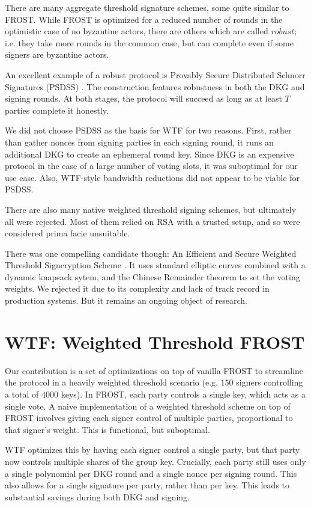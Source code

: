 \documentclass{article}
\begin{document}
There are many aggregate threshold signature schemes, some quite similar to FROST.  While FROST is optimized for a reduced number of rounds in the optimistic case of no byzantine actors, there are others which are called $robust$; i.e. they take more rounds in the common case, but can complete even if some signers are byzantine actors.

An excellent example of a robust protocol is Provably Secure Distributed Schnorr Signatures (PSDSS) \cite{psdss}.  The construction features robustness in both the DKG and signing rounds.  At both stages, the protocol will succeed as long as at least $T$ parties complete it honestly.

We did not choose PSDSS as the basis for WTF for two reasons.  First, rather than gather nonces from signing parties in each signing round, it runs an additional DKG to create an ephemeral round key.  Since DKG is an expensive protocol in the case of a large number of voting slots, it was suboptimal for our use case.  Also, WTF-style bandwidth reductions did not appear to be viable for PSDSS.

There are also many native weighted threshold signing schemes, but ultimately all were rejected.  Most of them relied on RSA with a trusted setup, and so were considered prima facie unsuitable.

There was one compelling candidate though: An Efficient and Secure Weighted Threshold Signcryption Scheme \cite{eswtss}.  It uses standard elliptic curves combined with a dynamic knapsack sytem, and the Chinese Remainder theorem to set the voting weights.  We rejected it due to its complexity and lack of track record in production systems.  But it remains an ongoing object of research.

\section{
  WTF: Weighted Threshold FROST
}

Our contribution is a set of optimizations on top of vanilla FROST to streamline the protocol in a heavily weighted threshold scenario (e.g. $150$ signers controlling a total of $4000$ keys). In FROST, each party controls a single key, which acts as a single vote.  A naive implementation of a weighted threshold scheme on top of FROST involves giving each signer control of multiple parties, proportional to that signer's weight.  This is functional, but suboptimal.

WTF optimizes this by having each signer control a single party, but that party now controls multiple shares of the group key.  Crucially, each party still uses only a single polynomial per DKG round and a single nonce per signing round.  This also allows for a single signature per party, rather than per key.  This leads to substantial savings during both DKG and signing.
\end{document}
